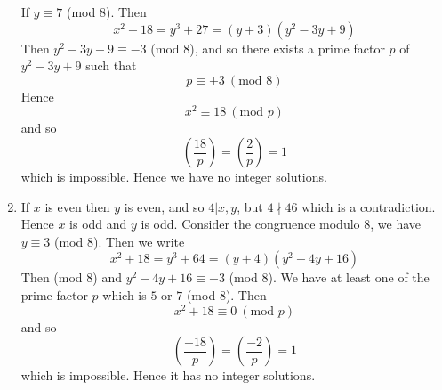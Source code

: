 \begin{enumerate}
If $y \equiv 7$ (mod $8$). Then
$$x^2-18=y^3+27=(y+3)(y^2-3y+9)$$
Then $y^2-3y+9 \equiv -3$ (mod $8$), and so there exists a prime factor $p$ of $y^2-3y+9$ such that
$$p \equiv \pm 3~(\text{mod } 8)$$
Hence
$$x^2 \equiv 18~(\text{mod }p)$$
and so
$$\left(\frac{18}{p}\right)=\left(\frac{2}{p}\right)=1$$
which is impossible. Hence we have no integer solutions.\\
\item If $x$ is even then $y$ is even, and so $4|x,y$, but $4 \nmid 46$ which is a contradiction.
Hence $x$ is odd and $y$ is odd. Consider the congruence modulo $8$, we have
$y \equiv 3$ (mod $8$). Then we write
$$x^2+18=y^3+64=(y+4)(y^2-4y+16)$$
Then (mod $8$) and $y^2-4y+16 \equiv -3$ (mod $8$). We have at least one of the prime factor $p$ which is
$5$ or $7$ (mod $8$). Then
$$x^2+18 \equiv 0~(\text{mod } p)$$
and so
$$\left(\frac{-18}{p}\right)=\left(\frac{-2}{p}\right)=1$$
which is impossible. Hence it has no integer solutions.


\end{enumerate}
